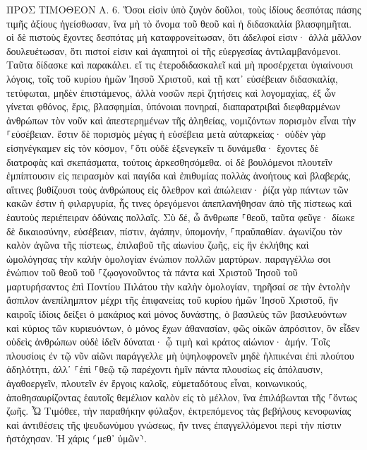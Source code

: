 \documentclass[twoside, 9pt]{extreport}
\begin{document}
ΠΡΟΣ ΤΙΜΟΘΕΟΝ Α.
6.
Ὅσοι εἰσὶν ὑπὸ ζυγὸν δοῦλοι, τοὺς ἰδίους δεσπότας πάσης τιμῆς ἀξίους ἡγείσθωσαν, ἵνα μὴ τὸ ὄνομα τοῦ θεοῦ καὶ ἡ διδασκαλία βλασφημῆται. 
οἱ δὲ πιστοὺς ἔχοντες δεσπότας μὴ καταφρονείτωσαν, ὅτι ἀδελφοί εἰσιν· ἀλλὰ μᾶλλον δουλευέτωσαν, ὅτι πιστοί εἰσιν καὶ ἀγαπητοὶ οἱ τῆς εὐεργεσίας ἀντιλαμβανόμενοι. Ταῦτα δίδασκε καὶ παρακάλει. 
εἴ τις ἑτεροδιδασκαλεῖ καὶ μὴ προσέρχεται ὑγιαίνουσι λόγοις, τοῖς τοῦ κυρίου ἡμῶν Ἰησοῦ Χριστοῦ, καὶ τῇ κατ᾽ εὐσέβειαν διδασκαλίᾳ, 
τετύφωται, μηδὲν ἐπιστάμενος, ἀλλὰ νοσῶν περὶ ζητήσεις καὶ λογομαχίας, ἐξ ὧν γίνεται φθόνος, ἔρις, βλασφημίαι, ὑπόνοιαι πονηραί, 
διαπαρατριβαὶ διεφθαρμένων ἀνθρώπων τὸν νοῦν καὶ ἀπεστερημένων τῆς ἀληθείας, νομιζόντων πορισμὸν εἶναι τὴν ⸀εὐσέβειαν. 
ἔστιν δὲ πορισμὸς μέγας ἡ εὐσέβεια μετὰ αὐταρκείας· 
οὐδὲν γὰρ εἰσηνέγκαμεν εἰς τὸν κόσμον, ⸀ὅτι οὐδὲ ἐξενεγκεῖν τι δυνάμεθα· 
ἔχοντες δὲ διατροφὰς καὶ σκεπάσματα, τούτοις ἀρκεσθησόμεθα. 
οἱ δὲ βουλόμενοι πλουτεῖν ἐμπίπτουσιν εἰς πειρασμὸν καὶ παγίδα καὶ ἐπιθυμίας πολλὰς ἀνοήτους καὶ βλαβεράς, αἵτινες βυθίζουσι τοὺς ἀνθρώπους εἰς ὄλεθρον καὶ ἀπώλειαν· 
ῥίζα γὰρ πάντων τῶν κακῶν ἐστιν ἡ φιλαργυρία, ἧς τινες ὀρεγόμενοι ἀπεπλανήθησαν ἀπὸ τῆς πίστεως καὶ ἑαυτοὺς περιέπειραν ὀδύναις πολλαῖς. 
Σὺ δέ, ὦ ἄνθρωπε ⸀θεοῦ, ταῦτα φεῦγε· δίωκε δὲ δικαιοσύνην, εὐσέβειαν, πίστιν, ἀγάπην, ὑπομονήν, ⸀πραϋπαθίαν. 
ἀγωνίζου τὸν καλὸν ἀγῶνα τῆς πίστεως, ἐπιλαβοῦ τῆς αἰωνίου ζωῆς, εἰς ἣν ἐκλήθης καὶ ὡμολόγησας τὴν καλὴν ὁμολογίαν ἐνώπιον πολλῶν μαρτύρων. 
παραγγέλλω σοι ἐνώπιον τοῦ θεοῦ τοῦ ⸀ζῳογονοῦντος τὰ πάντα καὶ Χριστοῦ Ἰησοῦ τοῦ μαρτυρήσαντος ἐπὶ Ποντίου Πιλάτου τὴν καλὴν ὁμολογίαν, 
τηρῆσαί σε τὴν ἐντολὴν ἄσπιλον ἀνεπίλημπτον μέχρι τῆς ἐπιφανείας τοῦ κυρίου ἡμῶν Ἰησοῦ Χριστοῦ, 
ἣν καιροῖς ἰδίοις δείξει ὁ μακάριος καὶ μόνος δυνάστης, ὁ βασιλεὺς τῶν βασιλευόντων καὶ κύριος τῶν κυριευόντων, 
ὁ μόνος ἔχων ἀθανασίαν, φῶς οἰκῶν ἀπρόσιτον, ὃν εἶδεν οὐδεὶς ἀνθρώπων οὐδὲ ἰδεῖν δύναται· ᾧ τιμὴ καὶ κράτος αἰώνιον· ἀμήν. 
Τοῖς πλουσίοις ἐν τῷ νῦν αἰῶνι παράγγελλε μὴ ὑψηλοφρονεῖν μηδὲ ἠλπικέναι ἐπὶ πλούτου ἀδηλότητι, ἀλλ᾽ ⸀ἐπὶ ⸀θεῷ τῷ παρέχοντι ἡμῖν πάντα πλουσίως εἰς ἀπόλαυσιν, 
ἀγαθοεργεῖν, πλουτεῖν ἐν ἔργοις καλοῖς, εὐμεταδότους εἶναι, κοινωνικούς, 
ἀποθησαυρίζοντας ἑαυτοῖς θεμέλιον καλὸν εἰς τὸ μέλλον, ἵνα ἐπιλάβωνται τῆς ⸀ὄντως ζωῆς. 
Ὦ Τιμόθεε, τὴν παραθήκην φύλαξον, ἐκτρεπόμενος τὰς βεβήλους κενοφωνίας καὶ ἀντιθέσεις τῆς ψευδωνύμου γνώσεως, 
ἥν τινες ἐπαγγελλόμενοι περὶ τὴν πίστιν ἠστόχησαν. Ἡ χάρις ⸂μεθ᾽ ὑμῶν⸃. 
\end{document}
